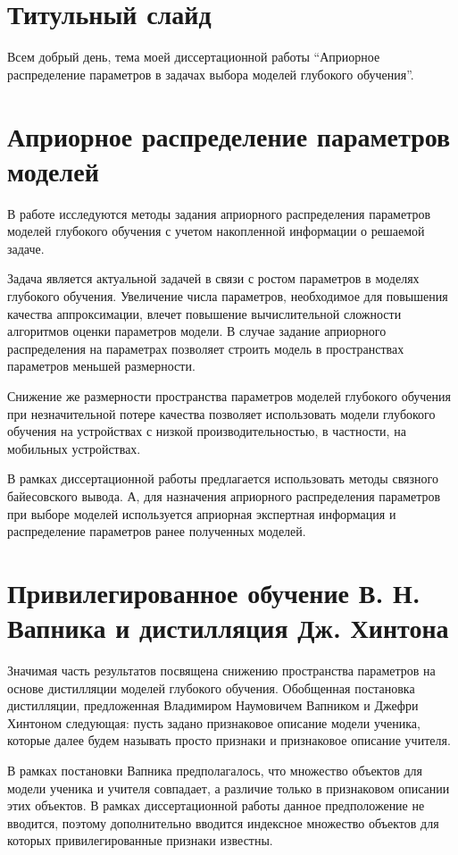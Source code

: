 \documentclass[10pt, twoside]{article}
\begin{document}
\section{Титульный слайд}
Всем добрый день, тема моей диссертационной работы ``Априорное распределение параметров в задачах выбора моделей глубокого обучения''.

\section{Априорное распределение параметров моделей}
В работе исследуются методы задания априорного распределения параметров моделей глубокого обучения с учетом накопленной информации о решаемой задаче.

Задача является актуальной задачей в связи с ростом параметров в моделях глубокого обучения. Увеличение числа параметров, необходимое для повышения качества аппроксимации, влечет повышение вычислительной сложности алгоритмов оценки параметров модели. В случае задание априорного распределения на параметрах позволяет строить модель в пространствах параметров меньшей размерности.

Снижение же размерности пространства параметров моделей глубокого обучения при незначительной потере качества позволяет использовать модели глубокого обучения на устройствах с низкой производительностью, в частности, на мобильных устройствах.

В рамках диссертационной работы предлагается использовать методы связного байесовского вывода. А, для назначения априорного распределения параметров при выборе моделей используется априорная экспертная информация и распределение параметров ранее полученных моделей.

\section{Привилегированное обучение В. Н. Вапника и дистилляция Дж. Хинтона}
Значимая часть результатов посвящена снижению пространства параметров на основе дистилляции моделей глубокого обучения.
Обобщенная постановка дистилляции, предложенная Владимиром Наумовичем Вапником и Джефри Хинтоном следующая: пусть задано признаковое описание модели ученика, которые далее будем называть просто признаки и признаковое описание учителя.

В рамках постановки Вапника предполагалось, что множество объектов для модели ученика и учителя совпадает, а различие только в признаковом описании этих объектов. В рамках диссертационной работы данное предположение не вводится, поэтому дополнительно вводится индексное множество объектов для которых привилегированные признаки известны.
\end{document}
